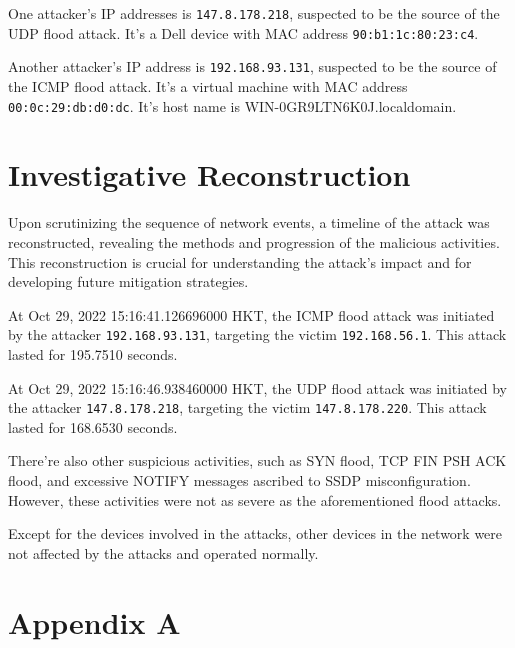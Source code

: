 \documentclass{article}
\begin{document}
    One attacker's IP addresses is \lstinline|147.8.178.218|, suspected to be the source of the UDP flood attack.
    It's a Dell device with MAC address \lstinline|90:b1:1c:80:23:c4|.

    Another attacker's IP address is \lstinline|192.168.93.131|, suspected to be the source of the ICMP flood attack.
    It's a virtual machine with MAC address \lstinline|00:0c:29:db:d0:dc|.
    It's host name is WIN-0GR9LTN6K0J.localdomain.

    
    \section{\fontsize{14pt}{17pt}\selectfont Investigative Reconstruction}\label{sec:selectfont-investigative-reconstruction}
    Upon scrutinizing the sequence of network events, a timeline of the attack was reconstructed,
    revealing the methods and progression of the malicious activities.
    This reconstruction is crucial for understanding the attack's impact and for developing future mitigation strategies.

    At Oct 29, 2022 15:16:41.126696000 HKT, the ICMP flood attack was initiated by the attacker \lstinline|192.168.93.131|,
    targeting the victim \lstinline|192.168.56.1|. This attack lasted for 195.7510 seconds.

    At Oct 29, 2022 15:16:46.938460000 HKT, the UDP flood attack was initiated by the attacker \lstinline|147.8.178.218|,
    targeting the victim \lstinline|147.8.178.220|. This attack lasted for 168.6530 seconds.

    There're also other suspicious activities, such as SYN flood, TCP FIN PSH ACK flood, and
    excessive NOTIFY messages ascribed to SSDP misconfiguration.
    However, these activities were not as severe as the aforementioned flood attacks.

    Except for the devices involved in the attacks, other devices in the network were not affected by the attacks and operated normally.


    \section*{\fontsize{14pt}{17pt}\selectfont Appendix A}\label{sec:selectfont-appendix-a}
\end{document}

